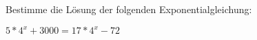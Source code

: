 
Bestimme die Lösung der folgenden Exponentialgleichung:

\begin{math}
	5*4^x + 3000 = 17 * 4^x - 72
\end{math}
